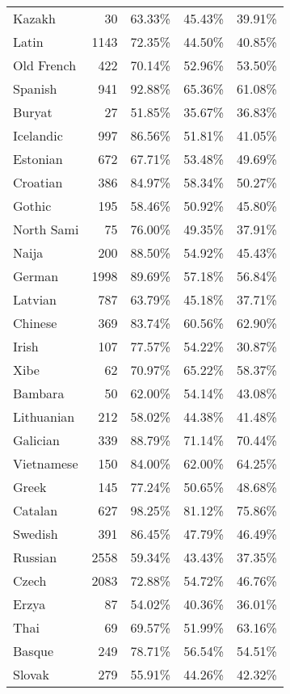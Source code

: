 \begin{longtable}{lrrrr}
    Kazakh & 30 & 63.33\% & 45.43\% & 39.91\% \\
    Latin & 1143 & 72.35\% & 44.50\% & 40.85\% \\
    Old French & 422 & 70.14\% & 52.96\% & 53.50\% \\
    Spanish & 941 & 92.88\% & 65.36\% & 61.08\% \\
    Buryat & 27 & 51.85\% & 35.67\% & 36.83\% \\
    Icelandic & 997 & 86.56\% & 51.81\% & 41.05\% \\
    Estonian & 672 & 67.71\% & 53.48\% & 49.69\% \\
    Croatian & 386 & 84.97\% & 58.34\% & 50.27\% \\
    Gothic & 195 & 58.46\% & 50.92\% & 45.80\% \\
    North Sami & 75 & 76.00\% & 49.35\% & 37.91\% \\
    Naija & 200 & 88.50\% & 54.92\% & 45.43\% \\
    German & 1998 & 89.69\% & 57.18\% & 56.84\% \\
    Latvian & 787 & 63.79\% & 45.18\% & 37.71\% \\
    Chinese & 369 & 83.74\% & 60.56\% & 62.90\% \\
    Irish & 107 & 77.57\% & 54.22\% & 30.87\% \\
    Xibe & 62 & 70.97\% & 65.22\% & 58.37\% \\
    Bambara & 50 & 62.00\% & 54.14\% & 43.08\% \\
    Lithuanian & 212 & 58.02\% & 44.38\% & 41.48\% \\
    Galician & 339 & 88.79\% & 71.14\% & 70.44\% \\
    Vietnamese & 150 & 84.00\% & 62.00\% & 64.25\% \\
    Greek & 145 & 77.24\% & 50.65\% & 48.68\% \\
    Catalan & 627 & 98.25\% & 81.12\% & 75.86\% \\
    Swedish & 391 & 86.45\% & 47.79\% & 46.49\% \\
    Russian & 2558 & 59.34\% & 43.43\% & 37.35\% \\
    Czech & 2083 & 72.88\% & 54.72\% & 46.76\% \\
    Erzya & 87 & 54.02\% & 40.36\% & 36.01\% \\
    Thai & 69 & 69.57\% & 51.99\% & 63.16\% \\
    Basque & 249 & 78.71\% & 56.54\% & 54.51\% \\
    Slovak & 279 & 55.91\% & 44.26\% & 42.32\% \\

\end{longtable}
